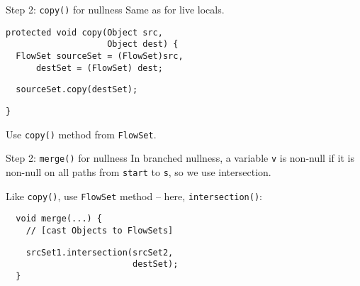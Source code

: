 \begin{slide}{Step 2: {\tt copy()} for nullness}
Same as for live locals.

\begin{verbatim}
protected void copy(Object src, 
                    Object dest) {
  FlowSet sourceSet = (FlowSet)src,
      destSet = (FlowSet) dest;

\end{verbatim}    
{\red\verb+  sourceSet.copy(destSet);+}
\begin{verbatim}
}
\end{verbatim}

\qquad

Use {\tt copy()} method from {\tt FlowSet}.
\end{slide}

\begin{slide}{Step 2: {\tt merge()} for nullness}
In branched nullness, a variable {\tt v} is non-null if it is non-null
on all paths from {\tt start} to {\tt s}, so we use intersection.

\qquad

Like {\tt copy()}, use {\tt FlowSet} method -- here, {\tt intersection()}:

\vspace*{0.05in}

\begin{verbatim}
  void merge(...) {
    // [cast Objects to FlowSets]
\end{verbatim}
{\red\verb+    srcSet1.intersection(srcSet2,+\\
     \verb+                         destSet);+}\\
\verb+  }+

\end{slide}



